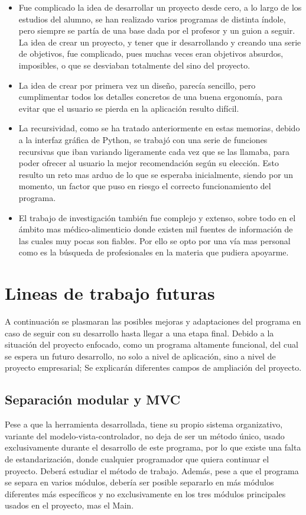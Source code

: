 \begin{itemize}
\item	Fue complicado la idea de desarrollar un proyecto desde cero, a lo largo de los estudios del alumno, se han realizado varios programas de distinta índole, pero siempre se partía de una base dada por el profesor y un guion a seguir. La idea de crear un proyecto, y tener que ir desarrollando y creando una serie de objetivos, fue complicado, pues muchas veces eran objetivos absurdos, imposibles, o que se desviaban totalmente del sino del proyecto.
\item	La idea de crear por primera vez un diseño, parecía sencillo, pero cumplimentar todos los detalles concretos de una buena ergonomía, para evitar que el usuario se pierda en la aplicación resulto difícil.
\item	La recursividad, como se ha tratado anteriormente en estas memorias, debido a la interfaz gráfica de Python, se trabajó con una serie de funciones recursivas que iban variando ligeramente cada vez que se las llamaba, para poder ofrecer al usuario la mejor recomendación según su elección. Esto resulto un reto mas arduo de lo que se esperaba inicialmente, siendo por un momento, un factor que puso en riesgo el correcto funcionamiento del programa.
\item	El trabajo de investigación también fue complejo y extenso, sobre todo en el ámbito mas médico-alimenticio donde existen mil fuentes de información de las cuales muy pocas son fiables. Por ello se opto por una vía mas personal como es la búsqueda de profesionales en la materia que pudiera apoyarme.
\end{itemize}

\section{Lineas de trabajo futuras}
A continuación se plasmaran las posibles mejoras y adaptaciones del programa en caso de seguir con su desarrollo hasta llegar a una etapa final. Debido a la situación del proyecto enfocado, como un programa altamente funcional, del cual se espera un futuro desarrollo, no solo a nivel de aplicación, sino a nivel de proyecto empresarial; Se explicarán diferentes campos de ampliación del proyecto.
\subsection{Separación modular y MVC}
Pese a que la herramienta desarrollada, tiene su propio sistema organizativo, variante del modelo-vista-controlador, no deja de ser un método único, usado exclusivamente durante el desarrollo de este programa, por lo que existe una falta de estandarización, donde cualquier programador que quiera continuar el proyecto. Deberá estudiar el método de trabajo. Además, pese a que el programa se separa en varios módulos, debería ser posible separarlo en más módulos diferentes más específicos y no exclusivamente en los tres módulos principales usados en el proyecto, mas el Main.
